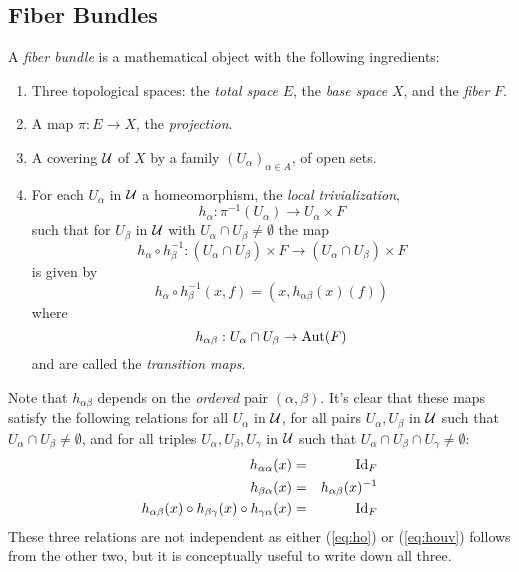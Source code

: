 \documentclass[12pt,titlepage]{article}
\def\cU{{\cal U}}
\def\Aut{\hbox{Aut}}
\def\Id{\hbox{Id}}
\begin{document}
\subsection{Fiber Bundles}
A {\em fiber bundle\/}
%
 is a mathematical object with the following ingredients:
\begin{enumerate}
\item Three topological spaces: the {\em total space\/} \(E\),
%
the {\em base space\/} \(X\),
%
and the {\em fiber\/} \(F\).
%
\item A map \(\pi:E \to X\),
\index{\(\pi\)}%
the {\em projection\/}.
%
\item A covering \(\cU\)
\index{\(U\)@\(\cU\)}%
of \(X\) by a family \((U_\alpha)_{\alpha\in A}\),
of open sets.
\item For each \(U_\alpha\) in \(\cU \) a homeomorphism, the {\em local
trivialization\/}, 
% 
\[
h_\alpha: \pi^{-1}(U_\alpha ) \to U_\alpha  \times F
\]
% 
such that for
 \(U_\beta\) in
\(\cU \) with \(U_\alpha\cap U_\beta  \neq \emptyset\)  the map
\[
h_\alpha  \circ h_\beta^{-1}: (U_\alpha \cap U_\beta ) \times F \to
(U_\alpha \cap U_\beta ) \times F
\]
is given by 
\begin{equation}\label{eq:trans}
h_\alpha  \circ h_\beta^{-1}(x,f) = (x,h_{\alpha\beta}(x)(f))
\end{equation}%
%
where
\[
h_{\alpha\beta}: U_\alpha \cap U_\beta  \to \Aut(F)
\] 
and are called the
{\em transition maps\/}.
%
\end{enumerate}%



Note that \(h_{\alpha\beta}\) depends on the {\em ordered\/} pair
\((\alpha,\beta)\).
It's clear that these maps
satisfy the following relations for all \(U_\alpha \) in \(\cU\), for all
 pairs \(U_\alpha ,U_\beta \) in
\(\cU\) such that \(U_\alpha \cap U_\beta  \neq \emptyset\), and 
for all
triples \(U_\alpha ,U_\beta ,U_\gamma\) in \(\cU\) such
that \(U_\alpha \cap U_\beta \cap U_\gamma\neq\emptyset\):
\begin{eqnarray}   \label{eq:ho}
h_{\alpha\alpha}(x) &=& \Id_F  \\ \label{eq:houv}
h_{\beta\alpha}(x) &=&  h_{\alpha\beta}(x)^{-1}\\ \label{eq:hocycle}
h_{\alpha\beta}(x)\circ h_{\beta\gamma}(x)\circ h_{\gamma\alpha}(x)
 &=& \Id_F
\end{eqnarray}%
These three relations are not independent as either (\ref{eq:ho}) or
(\ref{eq:houv}) follows from the other two, but it is conceptually
useful to write down all three.
\end{document}
